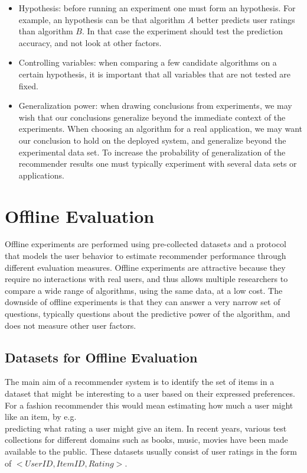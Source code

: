 \begin{itemize}
	\item Hypothesis: before running an experiment one must form an hypothesis. For
		example, an hypothesis can be that algorithm $A$ better predicts user ratings
		than algorithm $B$. In that case the experiment should test the prediction
		accuracy, and not look at other factors.

	\item Controlling variables: when comparing a few candidate algorithms on a
		certain hypothesis, it is important that all variables that are not tested
		are fixed.

	\item Generalization power: when drawing conclusions from experiments, we may
		wish that our conclusions generalize beyond the immediate context of the
		experiments. When choosing an algorithm for a real application, we may want
		our conclusion to hold on the deployed system, and generalize beyond the
		experimental data set. To increase the probability of generalization of the
		recommender results one must typically experiment with several data sets or
		applications.
\end{itemize}

\section{Offline Evaluation}
Offline experiments are performed using pre-collected dataset\(s\) and a protocol
that models the user behavior to estimate recommender performance through
different evaluation measures. Offline experiments are attractive because they
require no interactions with real users, and thus allows multiple  researchers to compare
a wide range of algorithms, using the same data, at a low cost. The downside of offline experiments
is that they can answer a very narrow set of questions, typically questions
about the predictive power of the algorithm, and does not measure other user
factors.

\subsection{Datasets for Offline Evaluation}
The main aim of a recommender system is to identify the set of items in a
dataset that might be interesting to a user based on their expressed
preferences. For a fashion recommender this would mean estimating how much a
user might like an item, by e.g.\\ predicting what rating a user might give an
item. In recent years, various test collections for different domains such as
books, music, movies have been made available to the public. These datasets
usually consist of user ratings in the form of $<UserID, ItemID, Rating>$.

